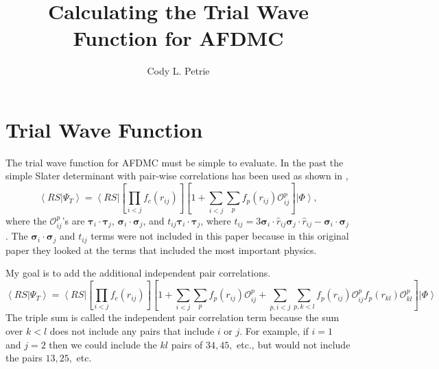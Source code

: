\documentclass[12pt]{extarticle}
\title{Calculating the Trial Wave Function for AFDMC}
\author{Cody L. Petrie}
\newcommand{\Oijp}{\mathcal{O}^p_{ij}}
\newcommand{\Oklp}{\mathcal{O}^p_{kl}}
\newcommand{\ket}[1]{\left| #1 \right>}
\newcommand{\bra}[1]{\left< #1 \right|}
\newcommand{\braket}[2]{\left< #1 | #2 \right>}
\newcommand{\taui}{\bm{\tau}_i}
\newcommand{\tauj}{\bm{\tau}_j}
\newcommand{\sigmai}{\bm{\sigma}_i}
\newcommand{\sigmaj}{\bm{\sigma}_j}
\newcommand{\tauij}{\taui \cdot \tauj}
\newcommand{\sigmaij}{\sigmai \cdot \sigmaj}
\begin{document}
\maketitle

\section{Trial Wave Function}
The trial wave function for AFDMC must be simple to evaluate. In the past the simple Slater determinant with pair-wise correlations has been used as shown in \cite{gandolfi2014},
\begin{equation}
  \braket{RS}{\Psi_T} = \bra{RS} \left[ \prod_{i<j}f_c(r_{ij}) \right] \left[ 1+\sum_{i<j}\sum_p f_p(r_{ij})\Oijp \right] \ket{\Phi},
  \label{equ:simpletrial}
\end{equation}
where the $\Oijp$'s are $\tauij$, $\sigmaij$, and $t_{ij}\tauij$, where $t_{ij} = 3\sigmai \cdot \hat{r}_{ij} \sigmaj \cdot \hat{r}_{ij}-\sigmaij$. The $\sigmaij$ and $t_{ij}$ terms were not included in this paper because in this original paper they looked at the terms that included the most important physics.

My goal is to add the additional independent pair correlations.
\begin{equation}
  \braket{RS}{\Psi_T} = \bra{RS} \left[ \prod_{i<j}f_c(r_{ij}) \right] \left[ 1+\sum_{i<j}\sum_p f_p(r_{ij})\Oijp + \sum_{p,i<j}\sum_{p,k<l} f_p(r_{ij})\Oijp f_p(r_{kl})\Oklp \right] \ket{\Phi}
\end{equation}
The triple sum is called the independent pair correlation term because the sum over $k<l$ does not include any pairs that include $i$ or $j$. For example, if $i=1$ and $j=2$ then we could include the $kl$ pairs of $34, 45,$ etc., but would not include the pairs $13, 25,$ etc.
\end{document}
